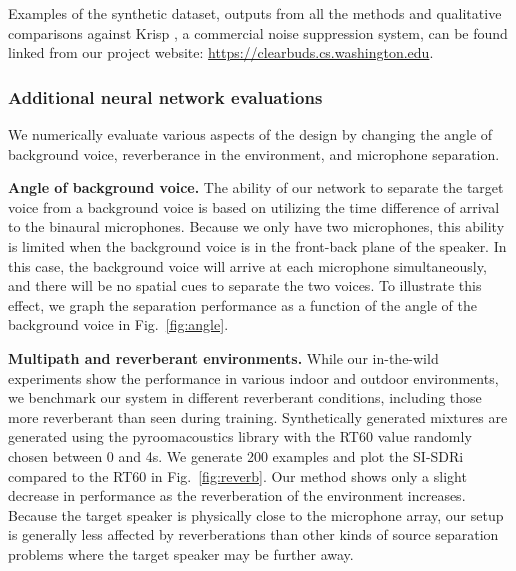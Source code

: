 \documentclass [11pt, proquest] {uwthesis}[2020/02/24]
\begin{document}
Examples of the synthetic dataset, outputs from all the methods and  qualitative comparisons against Krisp \cite{krisp}, a commercial noise suppression system, can be found linked from our project website: 
\textcolor{blue}{{{\url{https://clearbuds.cs.washington.edu}}}}.




\subsubsection{Additional neural network  evaluations} We numerically evaluate various aspects of the design by changing the angle of background voice,  reverberance in the  environment, and microphone separation.

{\bf Angle of background voice.} The ability of our network to separate the target voice from a background voice is based on utilizing the time difference of arrival to the binaural microphones. Because we only have two microphones, this ability is limited when the background voice is in the front-back plane of the speaker. In this case, the background voice will arrive at each microphone simultaneously, and there will be no spatial cues to separate the two voices.  To illustrate this effect, we graph the separation performance as a function of the angle of the background voice in Fig.~\ref{fig:angle}. 


{\bf Multipath and reverberant environments.} While our in-the-wild experiments show the performance  in various indoor and outdoor environments, we benchmark our system  in different  reverberant conditions, including those more reverberant than seen during training. Synthetically generated mixtures are generated using the pyroomacoustics library  with the RT60 value randomly chosen between 0 and 4s. We generate 200 examples and plot the SI-SDRi compared to the RT60 in Fig.~\ref{fig:reverb}. Our method shows only a slight decrease in performance as the reverberation of the environment increases. Because the target speaker is physically close to the microphone array, our setup is generally less affected by reverberations than other kinds of source separation problems where the target speaker may be further away.
\end{document}
